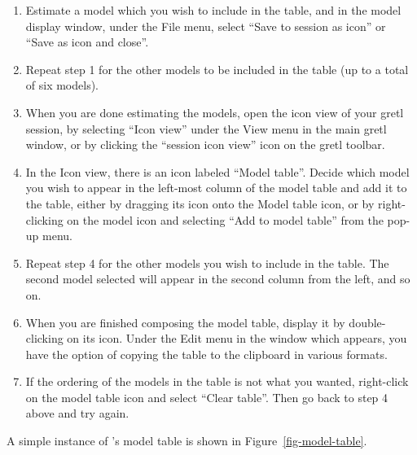       
\begin{enumerate}
\item Estimate a model which you wish to include in the table, and in
  the model display window, under the File menu, select ``Save to
  session as icon'' or ``Save as icon and close''.
\item Repeat step 1 for the other models to be included in the table
  (up to a total of six models).
\item When you are done estimating the models, open the icon view of
  your gretl session, by selecting ``Icon view'' under the View
  menu in the main gretl window, or by clicking the ``session icon
  view'' icon on the gretl toolbar.
\item In the Icon view, there is an icon labeled ``Model table''.
  Decide which model you wish to appear in the left-most column of the
  model table and add it to the table, either by dragging its icon
  onto the Model table icon, or by right-clicking on the model icon
  and selecting ``Add to model table'' from the pop-up menu.
\item Repeat step 4 for the other models you wish to include in the
  table.  The second model selected will appear in the second column
  from the left, and so on.
\item When you are finished composing the model table, display it by
  double-clicking on its icon.  Under the Edit menu in the window
  which appears, you have the option of copying the table to the
  clipboard in various formats.
\item If the ordering of the models in the table is not what you
  wanted, right-click on the model table icon and select ``Clear
  table''.  Then go back to step 4 above and try again.
\end{enumerate}

A simple instance of 's model table is shown in
Figure~\ref{fig-model-table}.

